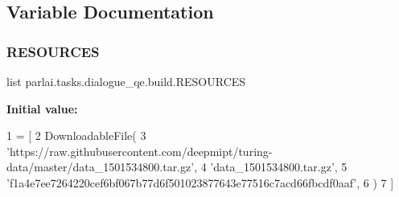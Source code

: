 \subsection{Variable Documentation}
\mbox{\label{namespaceparlai_1_1tasks_1_1dialogue__qe_1_1build_af0ab4b4e1f87decf7c4ff7549518511a}} 
\subsubsection{\texorpdfstring{R\+E\+S\+O\+U\+R\+C\+ES}{RESOURCES}}
{\footnotesize\ttfamily list parlai.\+tasks.\+dialogue\+\_\+qe.\+build.\+R\+E\+S\+O\+U\+R\+C\+ES}

{\bfseries Initial value\+:}
\begin{DoxyCode}
1 =  [
2     DownloadableFile(
3         \textcolor{stringliteral}{'https://raw.githubusercontent.com/deepmipt/turing-data/master/data\_1501534800.tar.gz'},
4         \textcolor{stringliteral}{'data\_1501534800.tar.gz'},
5         \textcolor{stringliteral}{'f1a4e7ee7264220cef6bf067b77d6f501023877643e77516c7acd66fbcdf0aaf'},
6     )
7 ]
\end{DoxyCode}
